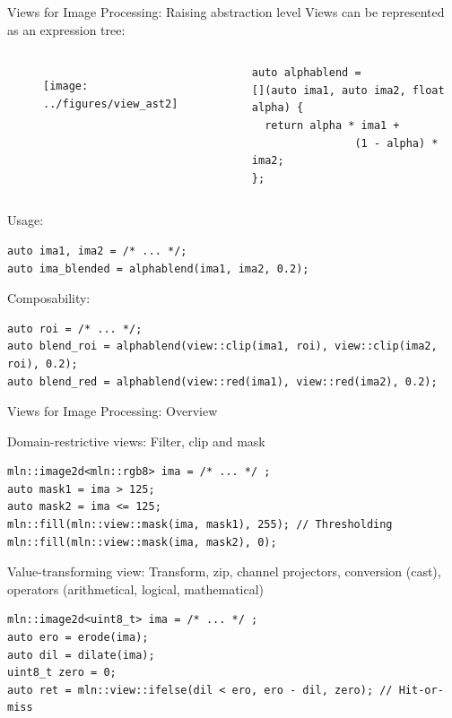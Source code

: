 \documentclass[12pt,aspectratio=169]{beamer}
\begin{document}
\begin{frame}[fragile]{Views for Image Processing: Raising abstraction level}
  Views can be represented as an expression tree:

  \begin{columns}[T,onlytextwidth]
    \centering
    \begin{figure}
      \texttt{[image: ../figures/view\_ast2]}
    \end{figure}

    \begin{verbatim}
auto alphablend =
[](auto ima1, auto ima2, float alpha) {
  return alpha * ima1 +
                (1 - alpha) * ima2;
};
  \end{verbatim}
  \end{columns}

  \begin{alertblock}{Usage:}
    \begin{verbatim}
auto ima1, ima2 = /* ... */;
auto ima_blended = alphablend(ima1, ima2, 0.2);
    \end{verbatim}
  \end{alertblock}

  \begin{alertblock}{Composability:}
    \begin{verbatim}
auto roi = /* ... */;
auto blend_roi = alphablend(view::clip(ima1, roi), view::clip(ima2, roi), 0.2);
auto blend_red = alphablend(view::red(ima1), view::red(ima2), 0.2);
    \end{verbatim}
  \end{alertblock}

\end{frame}

\begin{frame}[fragile]{Views for Image Processing: Overview}
  \begin{alertblock}{Domain-restrictive views:}
    Filter, clip and mask
    \begin{verbatim}
mln::image2d<mln::rgb8> ima = /* ... */ ;
auto mask1 = ima > 125;
auto mask2 = ima <= 125;
mln::fill(mln::view::mask(ima, mask1), 255); // Thresholding
mln::fill(mln::view::mask(ima, mask2), 0);
    \end{verbatim}
  \end{alertblock}

  \begin{alertblock}{Value-transforming view:}
    Transform, zip, channel projectors, conversion (cast), operators (arithmetical, logical, mathematical)
    \begin{verbatim}
mln::image2d<uint8_t> ima = /* ... */ ;
auto ero = erode(ima);
auto dil = dilate(ima);
uint8_t zero = 0;
auto ret = mln::view::ifelse(dil < ero, ero - dil, zero); // Hit-or-miss
    \end{verbatim}
  \end{alertblock}
\end{frame}
\end{document}
